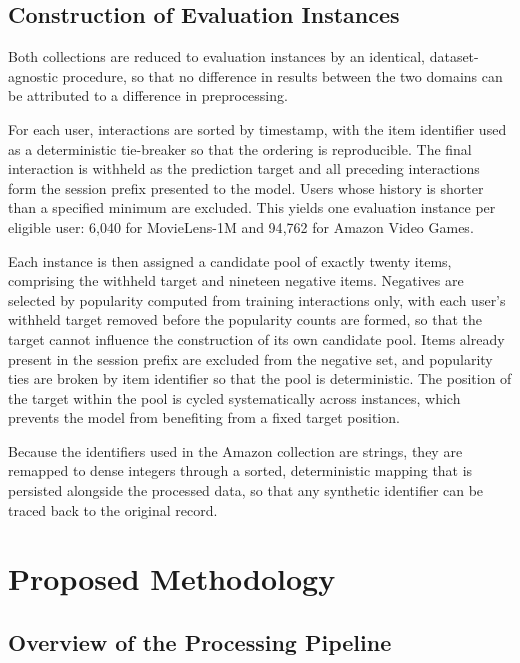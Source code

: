 \documentclass[12pt,a4paper,oneside]{report}
\begin{document}
\section{Construction of Evaluation Instances}

Both collections are reduced to evaluation instances by an identical,
dataset-agnostic procedure, so that no difference in results between the two
domains can be attributed to a difference in preprocessing.

For each user, interactions are sorted by timestamp, with the item identifier
used as a deterministic tie-breaker so that the ordering is reproducible. The
final interaction is withheld as the prediction target and all preceding
interactions form the session prefix presented to the model. Users whose history
is shorter than a specified minimum are excluded. This yields one evaluation
instance per eligible user: 6{,}040 for MovieLens-1M and 94{,}762 for Amazon
Video Games.

Each instance is then assigned a candidate pool of exactly twenty items,
comprising the withheld target and nineteen negative items. Negatives are
selected by popularity computed from training interactions only, with each user's
withheld target removed before the popularity counts are formed, so that the
target cannot influence the construction of its own candidate pool. Items
already present in the session prefix are excluded from the negative set, and
popularity ties are broken by item identifier so that the pool is deterministic.
The position of the target within the pool is cycled systematically across
instances, which prevents the model from benefiting from a fixed target
position.

Because the identifiers used in the Amazon collection are strings, they are
remapped to dense integers through a sorted, deterministic mapping that is
persisted alongside the processed data, so that any synthetic identifier can be
traced back to the original record.

\chapter{Proposed Methodology}

\section{Overview of the Processing Pipeline}
\end{document}

